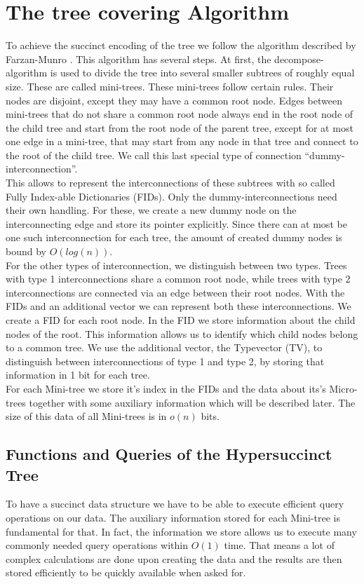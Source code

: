 \documentclass{article}
\begin{document}
\section{The tree covering Algorithm}
To achieve the succinct encoding of the tree we follow the algorithm described by Farzan-Munro \cite{farzanMunro}. This algorithm has several steps. At first, the decompose-algorithm is used to divide the tree into several smaller subtrees of roughly equal size. These are called mini-trees. These mini-trees follow certain rules. Their nodes are disjoint, except they may have a common root node. Edges between mini-trees that do not share a common root node always end in the root node of the child tree and start from the root node of the parent tree, except for at most one edge in a mini-tree, that may start from any node in that tree and connect to the root of the child tree. We call this last special type of connection “dummy-interconnection”.\\
This allows to represent the interconnections of these subtrees with so called Fully Index-able Dictionaries (FIDs). Only the dummy-interconnections need their own handling. For these, we create a new dummy node on the interconnecting edge and store its pointer explicitly. Since there can at most be one such interconnection for each tree, the amount of created dummy nodes is bound by $O(log (n))$.\\
For the other types of interconnection, we distinguish between two types. Trees with type 1 interconnections share a common root node, while trees with type 2 interconnections are connected via an edge between their root nodes. With the FIDs and an additional vector we can represent both these interconnections. We create a FID for each root node. In the FID we store information about the child nodes of the root. This information allows us to identify which child nodes belong to a common tree. We use the additional vector, the Typevector (TV), to distinguish between interconnections of type 1 and type 2, by storing that information in 1 bit for each tree.\\
For each Mini-tree we store it's index in the FIDs and the data about its's Micro-trees together with some auxiliary information which will be described later. The size of this data of all Mini-trees is in $o(n)$ bits.

\subsection{Functions and Queries of the Hypersuccinct Tree}
To have a succinct data structure we have to be able to execute efficient query operations on our data. The auxiliary information stored for each Mini-tree is fundamental for that. In fact, the information we store allows us to execute many commonly needed query operations within $O(1)$ time. That means a lot of complex calculations are done upon creating the data and the results are then stored efficiently to be quickly available when asked for. \\
\end{document}
